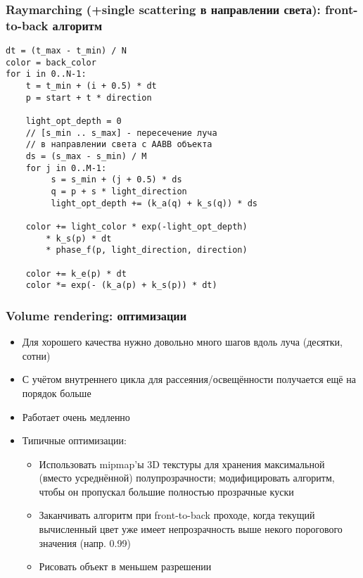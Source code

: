 \documentclass[10pt]{beamer}
\begin{document}
\begin{frame}[fragile]
\frametitle{Raymarching (+single scattering в направлении света): front-to-back алгоритм}
\begin{verbatim}
dt = (t_max - t_min) / N
color = back_color
for i in 0..N-1:
    t = t_min + (i + 0.5) * dt
    p = start + t * direction

    light_opt_depth = 0
    // [s_min .. s_max] - пересечение луча
    // в направлении света с AABB объекта
    ds = (s_max - s_min) / M
    for j in 0..M-1:
         s = s_min + (j + 0.5) * ds
         q = p + s * light_direction
         light_opt_depth += (k_a(q) + k_s(q)) * ds
         
    color += light_color * exp(-light_opt_depth)
        * k_s(p) * dt
        * phase_f(p, light_direction, direction)

    color += k_e(p) * dt
    color *= exp(- (k_a(p) + k_s(p)) * dt)
\end{verbatim}
\end{frame}

\begin{frame}[fragile]
\frametitle{Volume rendering: оптимизации}
\begin{itemize}
\item Для хорошего качества нужно довольно много шагов вдоль луча (десятки, сотни)
\pause
\item С учётом внутреннего цикла для рассеяния/освещённости получается ещё на порядок больше
\pause
\item Работает очень медленно
\pause
\item Типичные оптимизации:
\begin{itemize}
\item Использовать mipmap'ы 3D текстуры для хранения максимальной (вместо усреднённой) полупрозрачности; модифицировать алгоритм, чтобы он пропускал большие полностью прозрачные куски
\pause
\item Заканчивать алгоритм при front-to-back проходе, когда текущий вычисленный цвет уже имеет непрозрачность выше некого порогового значения (напр. 0.99)
\pause
\item Рисовать объект в меньшем разрешении
\end{itemize}
\end{itemize}
\end{frame}
\end{document}
